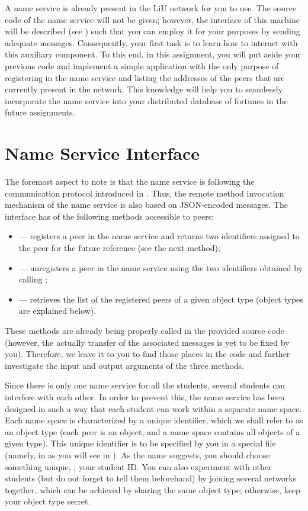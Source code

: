 \documentclass[a4paper]{article}
\begin{document}
A name service is already present in the LiU network for you to use. The source
code of the name service will not be given; however, the interface of this
machine will be described (see ) such that you can employ it for
your purposes by sending adequate messages. Consequently, your first task is to
learn how to interact with this auxiliary component. To this end, in this
assignment, you will put aside your previous code and implement a simple
application with the only purpose of registering in the name service and listing
the addresses of the peers that are currently present in the network. This
knowledge will help you to seamlessly incorporate the name service into your
distributed database of fortunes in the future assignments.

\section{Name Service Interface} 
The foremost aspect to note is that the name service is following the
communication protocol introduced in . Thus, the remote method
invocation mechanism of the name service is also based on JSON-encoded messages.
The interface has of the following methods accessible to peers:
\begin{itemize}

  \item {} --- registers a peer in the name service and returns two
  identifiers assigned to the peer for the future reference (see the next
  method);

  \item {} --- unregisters a peer in the name service using the
  two identifiers obtained by calling ;

  \item {} --- retrieves the list of the registered peers of a
  given object type (object types are explained below).

\end{itemize}
These methods are already being properly called in the provided source code
(however, the actually transfer of the associated messages is yet to be fixed by
you). Therefore, we leave it to you to find those places in the code and further
investigate the input and output arguments of the three methods.

Since there is only one name service for all the students, several students can
interfere with each other. In order to prevent this, the name service has been
designed in such a way that each student can work within a separate name space.
Each name space is characterized by a unique identifier, which we shall refer to
as an object type (each peer is an object, and a name space contains all objects
of a given type). This unique identifier is to be specified by you in a special
file (namely, in  as you will see in ). As
the name suggests, you should choose something unique, \eg, your student ID. You
can also experiment with other students (but do not forget to tell them
beforehand) by joining several networks together, which can be achieved by
sharing the same object type; otherwise, keep your object type secret.
\end{document}
